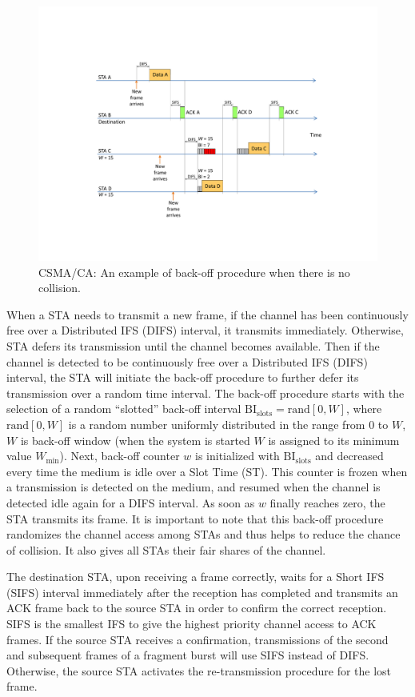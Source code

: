 \begin{figure}[!t]
	\centering
	\includegraphics[width=0.9\columnwidth]{figures2/CSMA-CA-back-off-no-collision}
	\caption{CSMA/CA: An example of back-off procedure when there is no collision.}
	\label{figs:CSMA-CA-back-off-no-collision}
\end{figure}

When a STA needs to transmit a new frame, if the channel has been continuously free over a Distributed IFS (DIFS) interval, it transmits immediately. Otherwise, STA defers its transmission until the channel becomes available. Then if the channel is detected to be continuously free over a Distributed IFS (DIFS) interval, the STA will initiate the back-off procedure to further defer its transmission over a random time interval. The back-off procedure starts with the selection of a random ``slotted'' back-off interval $\mathrm{BI_{slots}} = \mathrm{rand}[0,W]$, where $\mathrm{rand}[0,W]$ is a random number uniformly distributed in the range from $0$ to $W$, $W$ is back-off window (when the system is started $W$ is assigned to its minimum value $W_{\min}$). Next, back-off counter $w$ is initialized with $\mathrm{BI_{slots}}$ and decreased every time the medium is idle over a Slot Time (ST). This counter is frozen when a transmission is detected on the medium, and resumed when the channel is detected idle again for a DIFS interval. As soon as $w$ finally reaches zero, the STA transmits its frame. It is important to note that this back-off procedure randomizes the channel access among STAs and thus helps to reduce the chance of collision. It also gives all STAs their fair shares of the channel.

The destination STA, upon receiving a frame correctly, waits for a Short IFS (SIFS) interval immediately after the reception has completed and transmits an ACK frame back to the source STA in order to confirm the correct reception. SIFS is the smallest IFS to give the highest priority channel access to ACK frames. If the source STA receives a confirmation, transmissions of the second and subsequent frames of a fragment burst will use SIFS instead of DIFS. Otherwise, the source STA activates the re-transmission procedure for the lost frame.

